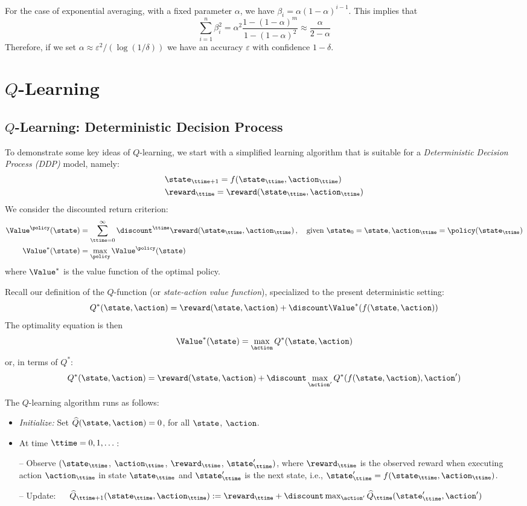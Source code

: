 For the case of exponential averaging, with a fixed parameter
$\alpha$, we have $\beta_i=\alpha(1-\alpha)^{i-1}$. This implies
that
\[
\sum_{i=1}^n \beta_i^2 =
\alpha^2\frac{1-(1-\alpha)^m}{1-(1-\alpha)^2}\approx
\frac{\alpha}{2-\alpha}
\]
Therefore, if we set $\alpha\approx \varepsilon^2/(\log (1/\delta))$
we have an accuracy $\varepsilon$ with confidence $1-\delta$.


\section{$Q$-Learning}
\subsection{ $Q$-Learning: Deterministic Decision Process}

To demonstrate some key ideas of $Q$-learning, we start with a
simplified learning algorithm that is suitable for a {\em
Deterministic Decision Process (DDP)} model, namely:
\begin{align*}
& \state_{\ttime+1}=f(\state_\ttime,\action_\ttime) \\
& \reward_\ttime=\reward(\state_\ttime,\action_\ttime)
\end{align*}
We consider the discounted return criterion:
\begin{align*}
\Value^{\policy}(\state) &=\sum_{\ttime=0}^\infty \discount^\ttime
\reward(\state_\ttime,\action_\ttime)\,,
\quad \text{given } \state_0=\state, \action_\ttime=\policy(\state_\ttime)\\
\Value^*(\state) &= \max_\policy \Value^\policy(\state)
\end{align*}
where $\Value^*$ is the value function of the optimal policy.

Recall our definition of the $Q$-function (or {\em state-action
value function}), specialized to the present deterministic setting:
$$
Q^*(\state,\action)=\reward(\state,\action)+\discount
\Value^*(f(\state,\action))
$$
The optimality equation is then
$$
\Value^*(\state) = \max_\action Q^*(\state,\action)
$$
or, in terms of $Q^*$:
$$
Q^*(\state,\action)=\reward(\state,\action)+\discount
\max_{\action'}Q^*(f(\state,\action),\action')
$$

The $Q$-learning algorithm runs as follows:
\begin{itemize}
\item {\em Initialize:} Set $\widehat{Q}(\state,\action)=0$, for all $\state$, $\action$.
\item At time $\ttime=0,1,\dots$:

-- Observe $(\state_\ttime$, $\action_\ttime$, $\reward_\ttime$,
$\state_{\ttime}')$, where $\reward_\ttime$ is the observed reward
when executing action $\action_\ttime$ in state $\state_\ttime$ and
$\state_\ttime'$ is the next state, i.e.,
$\state_\ttime'=f(\state_\ttime,\action_\ttime)$.

-- Update:\ \ \
$\widehat{Q}_{\ttime+1}(\state_\ttime,\action_\ttime) :=
\reward_\ttime+\discount \max_{\action'}
\widehat{Q}_\ttime(\state_{\ttime}',\action')$
\end{itemize}


